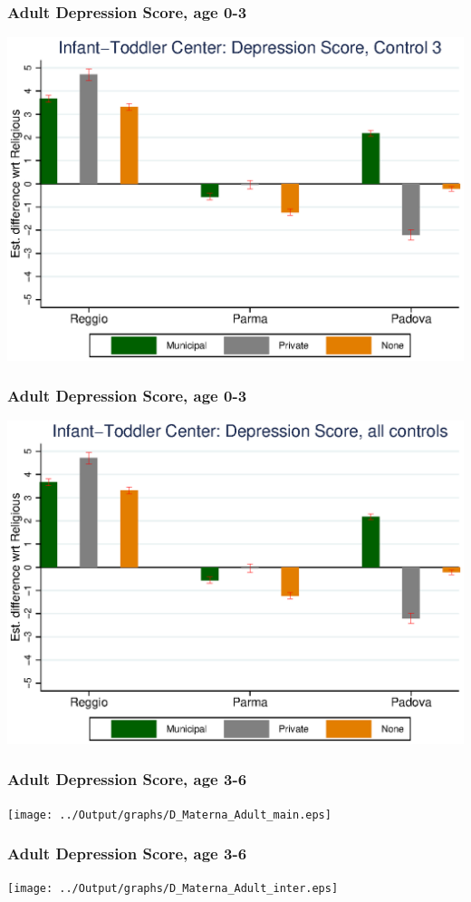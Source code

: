 \documentclass{beamer}
\begin{document}
\begin{frame}\frametitle{Adult Depression Score, age 0-3}
\center
\includegraphics[scale=0.7]{../Output/graphs/D_Asilo_Adult_right.eps}
\end{frame}

\begin{frame}\frametitle{Adult Depression Score, age 0-3}
\center
\includegraphics[scale=0.7]{../Output/graphs/D_Asilo_Adult_all.eps}
\end{frame}


\begin{frame}\frametitle{Adult Depression Score, age 3-6}
\center
\texttt{[image: ../Output/graphs/D\_Materna\_Adult\_main.eps]}
\end{frame}

\begin{frame}\frametitle{Adult Depression Score, age 3-6}
\center
\texttt{[image: ../Output/graphs/D\_Materna\_Adult\_inter.eps]}
\end{frame}
\end{document}
